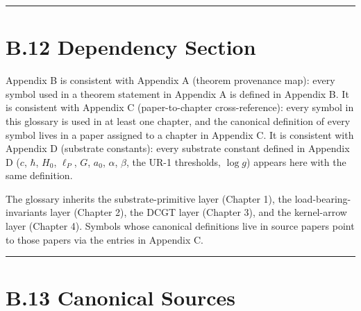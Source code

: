 \documentclass[11pt]{book}
\begin{document}
\bigskip\hrule\bigskip

\section{B.12 Dependency Section}

Appendix B is consistent with Appendix A (theorem provenance map): every symbol used in a theorem statement in Appendix A is defined in Appendix B. It is consistent with Appendix C (paper-to-chapter cross-reference): every symbol in this glossary is used in at least one chapter, and the canonical definition of every symbol lives in a paper assigned to a chapter in Appendix C. It is consistent with Appendix D (substrate constants): every substrate constant defined in Appendix D ($c$, $\hbar$, $H_0$, $\ell_P$, $G$, $a_0$, $\alpha$, $\beta$, the UR-1 thresholds, $\log g$) appears here with the same definition.

The glossary inherits the substrate-primitive layer (Chapter 1), the load-bearing-invariants layer (Chapter 2), the DCGT layer (Chapter 3), and the kernel-arrow layer (Chapter 4). Symbols whose canonical definitions live in source papers point to those papers via the entries in Appendix C.

\bigskip\hrule\bigskip

\section{B.13 Canonical Sources}
\end{document}
